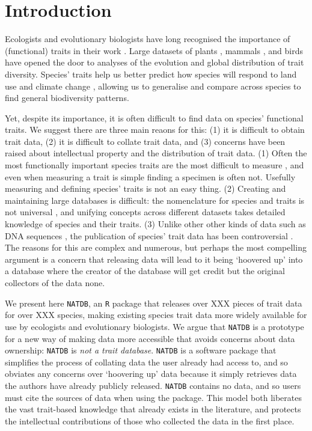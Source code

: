 \documentclass[12pt]{report}
\newcommand{\R}{\texttt{R}\xspace}
\newcommand{\natdb}{\texttt{NATDB}\xspace}
\begin{document}
\section{Introduction}
Ecologists and evolutionary biologists have long recognised the
importance of (functional) traits in their work
\autocite{Diaz2001}. Large datasets of plants \autocite{Kattge2011},
mammals \autocite{Jones2009}, and birds \autocite{Wilman2014} have
opened the door to analyses of the evolution \autocite{Harmon2010} and
global distribution \autocite{Kattge2011} of trait diversity.
Species' traits help us better predict how species will respond to
land use \autocite{Mayfield2010a} and climate change
\autocite{Estrada2016}, allowing us to generalise and compare across
species to find general biodiversity patterns. 

Yet, despite its importance, it is often difficult to find data on
species' functional traits. We suggest there are three main reaons for
this: (1) it is difficult to obtain trait data, (2) it is difficult to
collate trait data, and (3) concerns have been raised about
intellectual property and the distribution of trait data. (1) Often
the most functionally important species traits are the most difficult
to measure \autocite{Cornelissen2003,Violle2007}, and even when
measuring a trait is simple finding a specimen is often not. Usefully
measuring and defining species' traits is not an easy thing. (2)
Creating and maintaining large databases is difficult: the
nomenclature for species and traits is not universal
\autocite{Kattge2011,Hudson2017}, and unifying concepts across
different datasets takes detailed knowledge of species and their
traits. (3) Unlike other other kinds of data such as DNA sequences
\autocite{Benson2013}, the publication of species' trait data has been
controversial \autocite[\emph{e.g.},][]{Poisot2014,Moles2013}.
The reasons for this are complex and numerous, but perhaps the most
compelling argument is a concern that releasing data will lead to it
being `hoovered up' into a database where the creator of the database
will get credit but the original collectors of the data none.

We present here \natdb, an \R package that releases over XXX pieces of
trait data for over XXX species, making existing species trait data
more widely available for use by ecologists and evolutionary
biologists. We argue that \natdb is a prototype for a new way of
making data more accessible that avoids concerns about data ownership:
\natdb is \emph{not a trait database}. \natdb is a software package
that simplifies the process of collating data the user already had
access to, and so obviates any concerns over `hoovering up' data
because it simply retrieves data the authors have already publicly
released. \natdb contains no data, and so users must cite the sources
of data when using the package. This model both liberates the vast
trait-based knowledge that already exists in the literature, and
protects the intellectual contributions of those who collected the
data in the first place.
\end{document}
